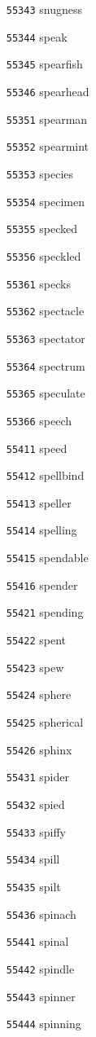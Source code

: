 \documentclass[twoside,11pt]{article}
\begin{document}
\begin{multicols}{5}
\begin{enumerate}
\item[\texttt{55343}] snugness
\item[\texttt{55344}] speak
\item[\texttt{55345}] spearfish
\item[\texttt{55346}] spearhead
\item[\texttt{55351}] spearman
\item[\texttt{55352}] spearmint
\item[\texttt{55353}] species
\item[\texttt{55354}] specimen
\item[\texttt{55355}] specked
\item[\texttt{55356}] speckled
\item[\texttt{55361}] specks
\item[\texttt{55362}] spectacle
\item[\texttt{55363}] spectator
\item[\texttt{55364}] spectrum
\item[\texttt{55365}] speculate
\item[\texttt{55366}] speech
\item[\texttt{55411}] speed
\item[\texttt{55412}] spellbind
\item[\texttt{55413}] speller
\item[\texttt{55414}] spelling
\item[\texttt{55415}] spendable
\item[\texttt{55416}] spender
\item[\texttt{55421}] spending
\item[\texttt{55422}] spent
\item[\texttt{55423}] spew
\item[\texttt{55424}] sphere
\item[\texttt{55425}] spherical
\item[\texttt{55426}] sphinx
\item[\texttt{55431}] spider
\item[\texttt{55432}] spied
\item[\texttt{55433}] spiffy
\item[\texttt{55434}] spill
\item[\texttt{55435}] spilt
\item[\texttt{55436}] spinach
\item[\texttt{55441}] spinal
\item[\texttt{55442}] spindle
\item[\texttt{55443}] spinner
\item[\texttt{55444}] spinning

\end{enumerate}
\end{multicols}
\end{document}
